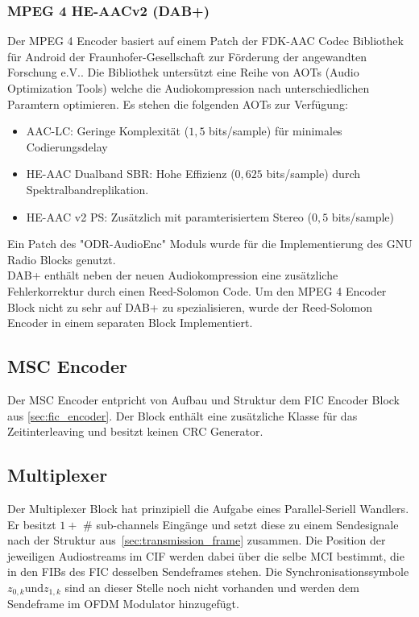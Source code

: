 \subsubsection{MPEG 4 HE-AACv2 (DAB+)}
Der MPEG 4 Encoder basiert auf einem Patch der FDK-AAC Codec Bibliothek für Android der Fraunhofer-Gesellschaft zur Förderung der angewandten Forschung e.V.. Die Bibliothek untersützt eine Reihe von AOTs (Audio Optimization Tools) welche die Audiokompression nach unterschiedlichen Paramtern optimieren. Es stehen die folgenden AOTs zur Verfügung:
\begin{itemize}
\item AAC-LC: Geringe Komplexität ($1,5$ bits/sample) für minimales Codierungsdelay
\item HE-AAC Dualband SBR: Hohe Effizienz ($0,625$ bits/sample) durch Spektralbandreplikation.
\item HE-AAC v2 PS: Zusätzlich mit paramterisiertem Stereo ($0,5$ bits/sample)
\end{itemize}
Ein Patch des "ODR-AudioEnc" Moduls wurde für die Implementierung des GNU Radio Blocks genutzt.\\
DAB+ enthält neben der neuen Audiokompression eine zusätzliche Fehlerkorrektur durch einen Reed-Solomon Code. Um den MPEG 4 Encoder Block nicht zu sehr auf DAB+ zu spezialisieren, wurde der Reed-Solomon Encoder in einem separaten Block Implementiert.

\subsection{MSC Encoder}
Der MSC Encoder entpricht von Aufbau und Struktur dem FIC Encoder Block aus \ref{sec:fic_encoder}. Der Block enthält eine zusätzliche Klasse für das Zeitinterleaving und besitzt keinen CRC Generator.

\subsection{Multiplexer}
Der Multiplexer Block hat prinzipiell die Aufgabe eines Parallel-Seriell Wandlers. Er besitzt $1 +$ \# sub-channels Eingänge und setzt diese zu einem Sendesignale nach der Struktur aus~\ref{sec:transmission_frame} zusammen. Die Position der jeweiligen Audiostreams im CIF werden dabei über die selbe MCI bestimmt, die in den FIBs des FIC desselben Sendeframes stehen. Die Synchronisationssymbole $z_{0,k} \text{und} z_{1,k}$ sind an dieser Stelle noch nicht vorhanden und werden dem Sendeframe im OFDM Modulator hinzugefügt.

